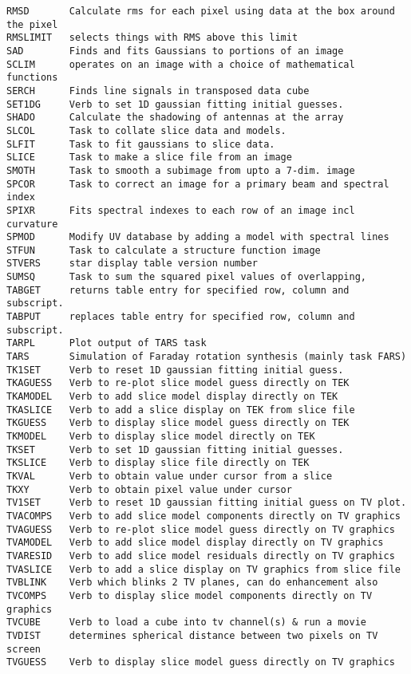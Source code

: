 \begin{verbatim}
RMSD       Calculate rms for each pixel using data at the box around the pixel
RMSLIMIT   selects things with RMS above this limit
SAD        Finds and fits Gaussians to portions of an image
SCLIM      operates on an image with a choice of mathematical functions
SERCH      Finds line signals in transposed data cube
SET1DG     Verb to set 1D gaussian fitting initial guesses.
SHADO      Calculate the shadowing of antennas at the array
SLCOL      Task to collate slice data and models.
SLFIT      Task to fit gaussians to slice data.
SLICE      Task to make a slice file from an image
SMOTH      Task to smooth a subimage from upto a 7-dim. image
SPCOR      Task to correct an image for a primary beam and spectral index
SPIXR      Fits spectral indexes to each row of an image incl curvature
SPMOD      Modify UV database by adding a model with spectral lines
STFUN      Task to calculate a structure function image
STVERS     star display table version number
SUMSQ      Task to sum the squared pixel values of overlapping,
TABGET     returns table entry for specified row, column and subscript.
TABPUT     replaces table entry for specified row, column and subscript.
TARPL      Plot output of TARS task
TARS       Simulation of Faraday rotation synthesis (mainly task FARS)
TK1SET     Verb to reset 1D gaussian fitting initial guess.
TKAGUESS   Verb to re-plot slice model guess directly on TEK
TKAMODEL   Verb to add slice model display directly on TEK
TKASLICE   Verb to add a slice display on TEK from slice file
TKGUESS    Verb to display slice model guess directly on TEK
TKMODEL    Verb to display slice model directly on TEK
TKSET      Verb to set 1D gaussian fitting initial guesses.
TKSLICE    Verb to display slice file directly on TEK
TKVAL      Verb to obtain value under cursor from a slice
TKXY       Verb to obtain pixel value under cursor
TV1SET     Verb to reset 1D gaussian fitting initial guess on TV plot.
TVACOMPS   Verb to add slice model components directly on TV graphics
TVAGUESS   Verb to re-plot slice model guess directly on TV graphics
TVAMODEL   Verb to add slice model display directly on TV graphics
TVARESID   Verb to add slice model residuals directly on TV graphics
TVASLICE   Verb to add a slice display on TV graphics from slice file
TVBLINK    Verb which blinks 2 TV planes, can do enhancement also
TVCOMPS    Verb to display slice model components directly on TV graphics
TVCUBE     Verb to load a cube into tv channel(s) & run a movie
TVDIST     determines spherical distance between two pixels on TV screen
TVGUESS    Verb to display slice model guess directly on TV graphics

\end{verbatim}

